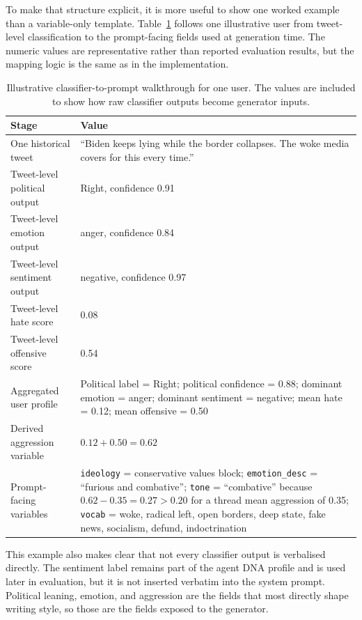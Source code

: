 \documentclass[logo,bsc,singlespacing,parskip,online]{infthesis}
\begin{document}
To make that structure explicit, it is more useful to show one worked example than a variable-only template. Table~\ref{tab:worked_prompt_example} follows one illustrative user from tweet-level classification to the prompt-facing fields used at generation time. The numeric values are representative rather than reported evaluation results, but the mapping logic is the same as in the implementation.

\begin{table}[ht]
\centering
\caption{Illustrative classifier-to-prompt walkthrough for one user. The values are included to show how raw classifier outputs become generator inputs.}
\label{tab:worked_prompt_example}
\begin{tabular}{p{}p{}}
\toprule
\textbf{Stage} & \textbf{Value} \\
\midrule
One historical tweet & ``Biden keeps lying while the border collapses. The woke media covers for this every time.'' \\
Tweet-level political output & Right, confidence 0.91 \\
Tweet-level emotion output & anger, confidence 0.84 \\
Tweet-level sentiment output & negative, confidence 0.97 \\
Tweet-level hate score & 0.08 \\
Tweet-level offensive score & 0.54 \\
Aggregated user profile & Political label = Right; political confidence = 0.88; dominant emotion = anger; dominant sentiment = negative; mean hate = 0.12; mean offensive = 0.50 \\
Derived aggression variable & $0.12 + 0.50 = 0.62$ \\
Prompt-facing variables & \texttt{ideology} = conservative values block; \texttt{emotion\_desc} = ``furious and combative''; \texttt{tone} = ``combative'' because $0.62 - 0.35 = 0.27 > 0.20$ for a thread mean aggression of 0.35; \texttt{vocab} = woke, radical left, open borders, deep state, fake news, socialism, defund, indoctrination \\
\bottomrule
\end{tabular}
\end{table}

This example also makes clear that not every classifier output is verbalised directly. The sentiment label remains part of the agent DNA profile and is used later in evaluation, but it is not inserted verbatim into the system prompt. Political leaning, emotion, and aggression are the fields that most directly shape writing style, so those are the fields exposed to the generator.
\end{document}
